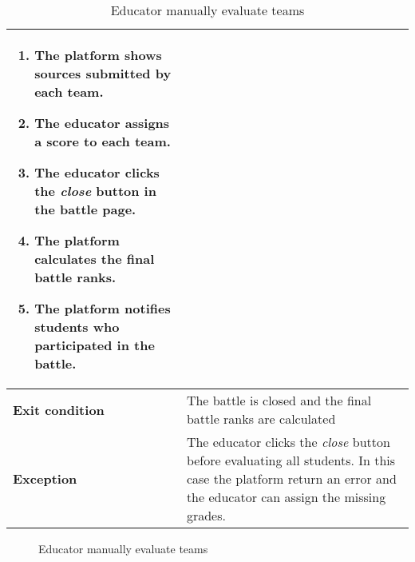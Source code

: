 \begin{enumerate}[label=\textbf{UC\arabic*}:,leftmargin=1.3cm]
\begin{table}[H]
\begin{tabular}{|l|p{11.9cm}|}
\begin{enumerate}[label=\arabic*.]
                              \item The platform shows sources submitted by each team.
                              \item The educator assigns a score to each team.
                              \item The educator clicks the \emph{close} button in the battle page.
                              \item The platform calculates the final battle ranks.
                              \item The platform notifies students who participated in the battle.
                        \end{enumerate}                 \\\hline
                        \textbf{Exit condition}  & The battle is closed and the final battle ranks are calculated              \\\hline
                        \textbf{Exception}       & The educator clicks the \emph{close} button before evaluating all students.
                        In this case the platform return an error and the educator can assign the missing grades.              \\\hline
                  \end{tabular}
                  \caption{Educator manually evaluate teams    }
                  \label{table:Educator manually evaluate teams    }
            \end{table}

            \begin{figure}[H]
                  \centering
                  \caption{Educator manually evaluate teams    }
                  \label{fig:Educator manually evaluate teams    }
            \end{figure}

            \pagebreak


\end{enumerate}
